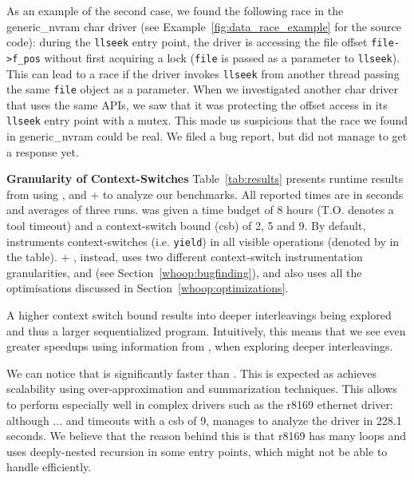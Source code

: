 As an example of the second case, we found the following race in the generic\_nvram char driver (see Example~\ref{fig:data_race_example} for the source code): during the \texttt{llseek} entry point, the driver is accessing the file offset \texttt{file->f\_pos} without first acquiring a lock (\texttt{file} is passed as a parameter to \texttt{llseek}). This can lead to a race if the driver invokes \texttt{llseek} from another thread passing the same \texttt{file} object as a parameter. When we investigated another char driver that uses the same APIs, we saw that it was protecting the offset access in its \texttt{llseek} entry point with a mutex. This made us suspicious that the race we found in generic\_nvram could be real. We filed a bug report, but did not manage to get a response yet.

\noindent
\textbf{Granularity of Context-Switches}\xspace\xspace Table~\ref{tab:results} presents runtime results from using \whoop, \corral and \whoop + \corral to analyze our benchmarks. All reported times are in seconds and averages of three runs. \corral was given a time budget of 8 hours (T.O. denotes a tool timeout) and a context-switch bound (csb) of 2, 5 and 9. By default, \corral instruments context-switches (i.e. \texttt{yield}) in all visible operations (denoted by \yieldall in the table). \whoop + \corral, instead, uses two different context-switch instrumentation granularities, \yieldcoarse and \yieldmr (see Section~\ref{whoop:bugfinding}), and also uses all the optimisations discussed in Section~\ref{whoop:optimizations}.

A higher context switch bound results into deeper interleavings being explored and thus a larger sequentialized program. Intuitively, this means that we see even greater speedups using information from \whoop, when exploring deeper interleavings.

We can notice that \whoop is significantly faster than \corral. This is expected as \whoop achieves scalability using over-approximation and summarization techniques. This allows \whoop to perform especially well in complex drivers such as the r8169 ethernet driver: although \corral ... and timeouts with a csb of 9, \whoop manages to analyze the driver in 228.1 seconds. We believe that the reason behind this is that r8169 has many loops and uses deeply-nested recursion in some entry points, which \corral might not be able to handle efficiently.


